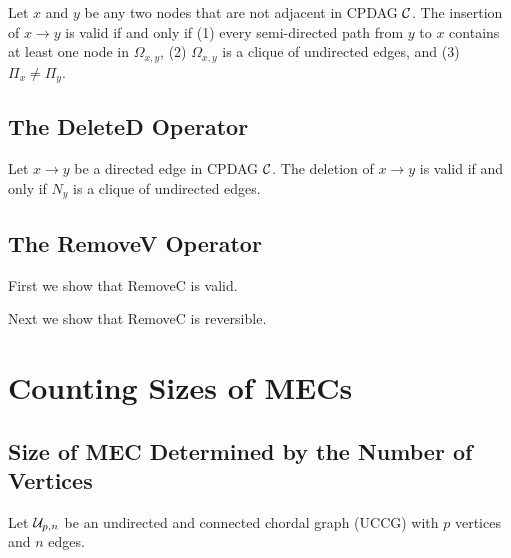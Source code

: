 \begin{theorem}
    Let $x$ and $y$ be any two nodes that are not adjacent in CPDAG $\mathcal{C}$. The insertion of $x \rightarrow y$ is valid if and only if (1) every semi-directed path from $y$ to $x$ contains at least one node in $\Omega_{x,y}$, (2) $\Omega_{x,y}$ is a clique of undirected edges, and (3) $\Pi_x \ne \Pi_y$.
\end{theorem}

\subsection{The DeleteD Operator}
\begin{theorem}
    Let $x \rightarrow y$ be a directed edge in CPDAG $\mathcal{C}$. The deletion of $x \rightarrow y$ is valid if and only if $N_y$ is a clique of undirected edges.
\end{theorem}


\subsection{The RemoveV Operator}
First we show that RemoveC is valid.
\begin{theorem}
    
\end{theorem}

Next we show that RemoveC is reversible.

\section{Counting Sizes of MECs}
\subsection{Size of MEC Determined by the Number of Vertices}
Let $\mathcal{U}_{p,n}$ be an undirected and connected chordal graph (UCCG) with $p$ vertices and $n$ edges.


